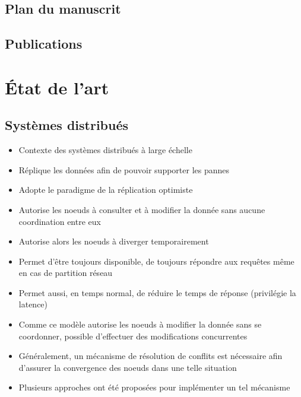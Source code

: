 \documentclass[12pt]{thesul}
\begin{document}
\section{Plan du manuscrit}
\section{Publications}
% 

% 

\NumberThisInToc
\chapter{État de l'art}
\minitoc

\section{Systèmes distribués}

\begin{itemize}
  \item Contexte des systèmes distribués à large échelle
  \item Réplique les données afin de pouvoir supporter les pannes
  \item Adopte le paradigme de la réplication optimiste \cite{10.1145/1057977.1057980}
  \item Autorise les noeuds à consulter et à modifier la donnée sans aucune coordination entre eux
  \item Autorise alors les noeuds à diverger temporairement
  \item Permet d'être toujours disponible, de toujours répondre aux requêtes même en cas de partition réseau
  \item Permet aussi, en temps normal, de réduire le temps de réponse (privilégie la latence) \cite{pacelc2012}
  \item Comme ce modèle autorise les noeuds à modifier la donnée sans se coordonner, possible d'effectuer des modifications concurrentes
  \item Généralement, un mécanisme de résolution de conflits est nécessaire afin d'assurer la convergence des noeuds dans une telle situation
  \item Plusieurs approches ont été proposées pour implémenter un tel mécanisme
\end{itemize}
\end{document}
